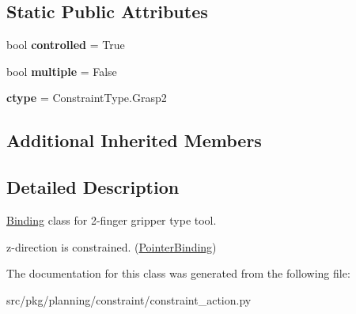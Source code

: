 \subsection*{Static Public Attributes}
\begin{DoxyCompactItemize}
\item 
\mbox{\label{classrnb-planning_1_1src_1_1pkg_1_1planning_1_1constraint_1_1constraint__action_1_1_gripper2_tool_ab80ddfcb1312350e7d546bf6079bc6fb}} 
bool {\bfseries controlled} = True
\item 
\mbox{\label{classrnb-planning_1_1src_1_1pkg_1_1planning_1_1constraint_1_1constraint__action_1_1_gripper2_tool_aaf8bad3a021490a1095a670d23845baf}} 
bool {\bfseries multiple} = False
\item 
\mbox{\label{classrnb-planning_1_1src_1_1pkg_1_1planning_1_1constraint_1_1constraint__action_1_1_gripper2_tool_a7ddf284603f3a8c42741647adfea6283}} 
{\bfseries ctype} = Constraint\+Type.\+Grasp2
\end{DoxyCompactItemize}
\subsection*{Additional Inherited Members}


\subsection{Detailed Description}
\hyperlink{classrnb-planning_1_1src_1_1pkg_1_1planning_1_1constraint_1_1constraint__action_1_1_binding}{Binding} class for 2-\/finger gripper type tool. 

z-\/direction is constrained. (\hyperlink{classrnb-planning_1_1src_1_1pkg_1_1planning_1_1constraint_1_1constraint__action_1_1_pointer_binding}{Pointer\+Binding}) 

The documentation for this class was generated from the following file\+:\begin{DoxyCompactItemize}
\item 
src/pkg/planning/constraint/constraint\+\_\+action.\+py\end{DoxyCompactItemize}
